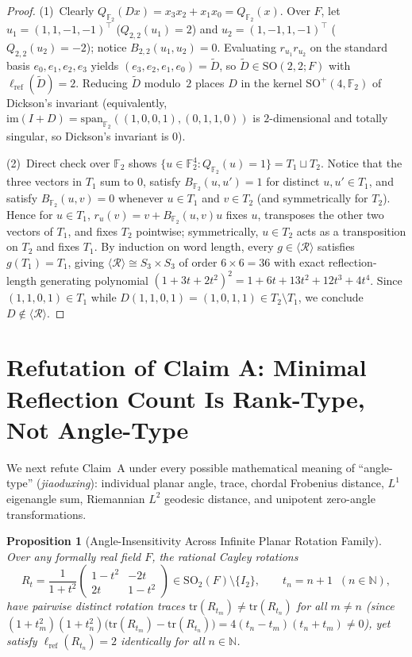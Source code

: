\documentclass[11pt,a4paper]{article}
\theoremstyle{plain}
\newtheorem{proposition}[theorem]{Proposition}
\theoremstyle{definition}
\newcommand{\N}{\mathbb{N}}
\newcommand{\F}{\mathbb{F}}
\newcommand{\SO}{\mathrm{SO}}
\newcommand{\Refl}{\mathcal{R}}
\newcommand{\lref}{\ell_{\mathrm{ref}}}
\newcommand{\tr}{\mathrm{tr}}
\newcommand{\im}{\mathrm{im}}
\newcommand{\spn}{\mathrm{span}}
\begin{document}
\begin{proof}
(1)~Clearly $Q_{\F_2}(D x) = x_3 x_2 + x_1 x_0 = Q_{\F_2}(x)$. Over $F$, let $u_1 = (1, 1, -1, -1)^\top$ ($Q_{2,2}(u_1) = 2$) and $u_2 = (1, -1, 1, -1)^\top$ ($Q_{2,2}(u_2) = -2$); notice $B_{2,2}(u_1, u_2) = 0$. Evaluating $r_{u_1} r_{u_2}$ on the standard basis $e_0, e_1, e_2, e_3$ yields $(e_3, e_2, e_1, e_0) = \widetilde{D}$, so $\widetilde{D} \in \SO(2, 2; F)$ with $\lref(\widetilde{D}) = 2$. Reducing $\widetilde{D}$ modulo~$2$ places $D$ in the kernel $\SO^+(4, \F_2)$ of Dickson's invariant (equivalently, $\im(I + D) = \spn_{\F_2}((1,0,0,1), (0,1,1,0))$ is $2$-dimensional and totally singular, so Dickson's invariant is $0$).

(2)~Direct check over $\F_2$ shows $\{u \in \F_2^4 : Q_{\F_2}(u) = 1\} = T_1 \sqcup T_2$. Notice that the three vectors in $T_1$ sum to $0$, satisfy $B_{\F_2}(u, u') = 1$ for distinct $u, u' \in T_1$, and satisfy $B_{\F_2}(u, v) = 0$ whenever $u \in T_1$ and $v \in T_2$ (and symmetrically for $T_2$). Hence for $u \in T_1$, $r_u(v) = v + B_{\F_2}(u, v) u$ fixes $u$, transposes the other two vectors of $T_1$, and fixes $T_2$ pointwise; symmetrically, $u \in T_2$ acts as a transposition on $T_2$ and fixes $T_1$. By induction on word length, every $g \in \langle \Refl \rangle$ satisfies $g(T_1) = T_1$, giving $\langle \Refl \rangle \cong S_3 \times S_3$ of order $6 \times 6 = 36$ with exact reflection-length generating polynomial $(1 + 3t + 2t^2)^2 = 1 + 6t + 13t^2 + 12t^3 + 4t^4$. Since $(1,1,0,1) \in T_1$ while $D(1,1,0,1) = (1,0,1,1) \in T_2 \setminus T_1$, we conclude $D \notin \langle \Refl \rangle$.
\end{proof}

\section{Refutation of Claim A: Minimal Reflection Count Is Rank-Type, Not Angle-Type}

We next refute Claim~A under every possible mathematical meaning of ``angle-type'' (\emph{jiaoduxing}): individual planar angle, trace, chordal Frobenius distance, $L^1$ eigenangle sum, Riemannian $L^2$ geodesic distance, and unipotent zero-angle transformations.

\begin{proposition}[Angle-Insensitivity Across Infinite Planar Rotation Family]
\label{prop:cayley-so2}
Over any formally real field $F$, the rational Cayley rotations
\[
  R_t = \frac{1}{1 + t^2} \begin{pmatrix} 1 - t^2 & -2t \\ 2t & 1 - t^2 \end{pmatrix} \in \SO_2(F) \setminus \{I_2\}, \qquad t_n = n + 1 \;\; (n \in \N),
\]
have pairwise distinct rotation traces $\tr(R_{t_m}) \neq \tr(R_{t_n})$ for all $m \neq n$ (since $(1+t_m^2)(1+t_n^2)\bigl(\tr(R_{t_m}) - \tr(R_{t_n})\bigr) = 4(t_n - t_m)(t_n + t_m) \neq 0$), yet satisfy $\lref(R_{t_n}) = 2$ identically for all $n \in \N$.
\end{proposition}
\end{document}
